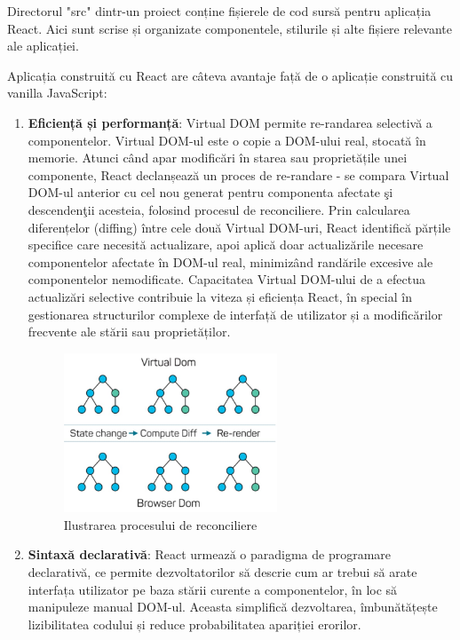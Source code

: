 \documentclass[12pt, a4paper]{report}
\begin{document}
Directorul "src" dintr-un proiect conține fișierele de cod sursă pentru aplicația React. Aici sunt scrise și organizate componentele, stilurile și alte fișiere relevante ale aplicației.

Aplicația construită cu React are câteva avantaje față de o aplicație construită cu vanilla JavaScript:

\begin{enumerate}
	\item \textbf{Eficiență și performanță}: Virtual DOM permite re-randarea selectivă a componentelor. Virtual DOM-ul este o copie a DOM-ului real, stocată în memorie. Atunci când apar modificări în starea sau proprietățile unei componente, React declanșează un proces de re-randare - se compara Virtual DOM-ul anterior cu cel nou generat pentru componenta afectate \c si descenden\c tii acesteia, folosind procesul de reconciliere. Prin calcularea diferențelor (diffing) între cele două Virtual DOM-uri, React identifică părțile specifice care necesită actualizare, apoi aplică doar actualizările necesare componentelor afectate în DOM-ul real, minimizând rand\u arile excesive ale componentelor nemodificate. Capacitatea Virtual DOM-ului de a efectua actualizări selective contribuie la viteza și eficiența React, în special în gestionarea structurilor complexe de interfață de utilizator și a modificărilor frecvente ale stării sau proprietăților.
	\begin{figure}[htbp]
		\centering
		\includegraphics[width=0.6\textwidth]{virtual-dom.jpeg}
		\caption{Ilustrarea procesului de reconciliere}
		\label{fig:virtual-dom}
	\end{figure}
	\item \textbf{Sintaxă declarativă}: React urmează o paradigma de programare declarativă, ce permite dezvoltatorilor să descrie cum ar trebui să arate interfața utilizator pe baza stării curente a componentelor, în loc să manipuleze manual DOM-ul. Aceasta simplifică dezvoltarea, îmbunătățește lizibilitatea codului și reduce probabilitatea apariției erorilor.

\end{enumerate}
\end{document}
